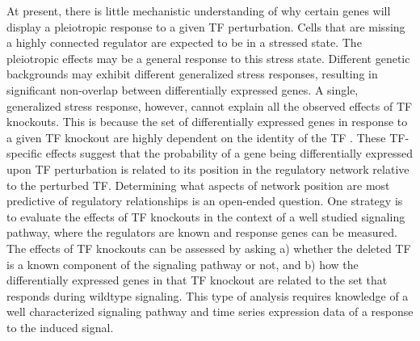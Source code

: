 At present, there is little mechanistic understanding of why certain genes will display a pleiotropic response to a given TF perturbation. Cells that are missing a highly connected regulator are expected to be in a stressed state. The pleiotropic effects may be a general response to this stress state. Different genetic backgrounds may exhibit different generalized stress responses, resulting in significant non-overlap between differentially expressed genes. A single, generalized stress response, however, cannot explain all the observed effects of TF knockouts. This is because the set of differentially expressed genes in response to a given TF knockout are highly dependent on the identity of the TF \cite{Liu2024}. These TF-specific effects suggest that the probability of a gene being differentially expressed upon TF perturbation is related to its position in the regulatory network relative to the perturbed TF. Determining what aspects of network position are most predictive of regulatory relationships is an open-ended question. One strategy is to evaluate the effects of TF knockouts in the context of a well studied signaling pathway, where the regulators are known and response genes can be measured. The effects of TF knockouts can be assessed by asking a) whether the deleted TF is a known component of the signaling pathway or not, and b) how the differentially expressed genes in that TF knockout are related to the set that responds during wildtype signaling. This type of analysis requires knowledge of a well characterized signaling pathway and time series expression data of a response to the induced signal.



